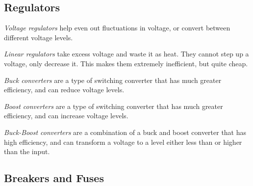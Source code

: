 \subsection{Regulators}

\textit{Voltage regulators} help even out fluctuations in voltage, or convert between different voltage levels.

\begin{asparaenum}
  \item \textit{Linear regulators} take excess voltage and waste it as heat. They cannot step up a voltage, only decrease it. This makes them extremely inefficient, but quite cheap. 
  \item \textit{Buck converters} are a type of switching converter that has much greater efficiency, and can reduce voltage levels.
  \item \textit{Boost converters} are a type of switching converter that has much greater efficiency, and can increase voltage levels.
  \item \textit{Buck-Boost converters} are a combination of a buck and boost converter that has high efficiency, and can transform a voltage to a level either less than or higher than the input.
\end{asparaenum}

\subsection{Breakers and Fuses}

